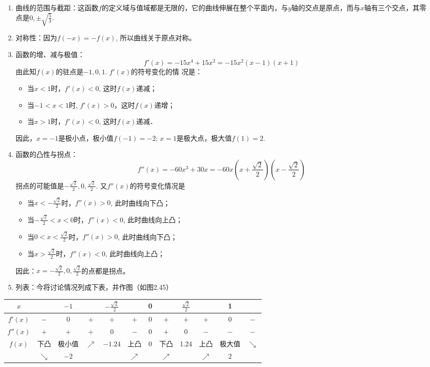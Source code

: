     \begin{solution}
    \begin{enumerate}
    \item 曲线的范围与截距：这函数$f$的定义域与值域都是无限的，它的曲线伸展在整个平面内，与$y$轴的交点是原点，而与$x$轴有三个交点，其零点是$0,\pm\sqrt{\frac{5}{3}}$.
    \item 对称性：因为$f(-x)=-f(x)$, 所以曲线关于原点对称。
    \item 函数的增、减与极值：
    \[f' (x) =-15x^4+15x^2=-15x^2 (x-1) (x+1)\]
    由此知$f(x)$的驻点是$-1, 0, 1$. $f'(x)$的符号变化的情
    况是：
    \begin{itemize}
        \item 当$x<1$时，$f'(x)<0$, 这时$f(x)$递减；
        \item 当$-1<x<1$时, $f'(x)>0$，这时$f(x)$递增；
        \item 当$x>1$时，$f'(x)<0$, 这时$f(x)$递减．
    \end{itemize}
    因此，$x=-1$是极小点，极小值$f(-1)=-2$; $x=1$是极大点，极大值$f(1)=2$.
    \item 函数的凸性与拐点：
    \[f''(x)=-60x^3+30x=-60x\left(x+\frac{\sqrt{2}}{2}\right)\left(x-\frac{\sqrt{2}}{2}\right)\]
    拐点的可能值是$-\frac{\sqrt{2}}{2},0,\frac{\sqrt{2}}{2}$. 又$f''(x)$的符号变化情况是
    \begin{itemize}
        \item 当$x<-\frac{\sqrt{2}}{2}$时，$f''(x)>0$, 此时曲线向下凸；
        \item 当$-\frac{\sqrt{2}}{2}<x<0$时，$f''(x)<0$, 此时曲线向上凸；
        \item 当$0<x<\frac{\sqrt{2}}{2}$时，$f''(x)>0$, 此时曲线向下凸；
        \item 当$x>\frac{\sqrt{2}}{2}$时，$f''(x)<0$, 此时曲线向上凸；
    \end{itemize}
    因此：$x=-\frac{\sqrt{2}}{2},0,\frac{\sqrt{2}}{2}$的点都是拐点。
    
    \item 列表：今将讨论情况列成下表，并作图（如图2.45）
    \end{enumerate}    
    \begin{center}\small
        \begin{tabular}{cccccccccccc}
        \hline
        $x$ & &$-1$&&$-\frac{\sqrt{2}}{2}$&&0&&$\frac{\sqrt{2}}{2}$&&1\\
        \hline
        $f'(x)$& $-$ & 0&$+$&$+$&$+$&0&$+$&$+$&$+$&0&$-$\\
        $f''(x)$&$+$&$+$&$+$&0&$-$&0&$+$&0&$-$&$-$&$-$\\
        $f(x)$&下凸&极小值& $\nearrow$  & $-1.24$&上凸 & 0& 下凸 &1.24& 上凸 & 极大值 & $\searrow$  \\
        & $\searrow $ &$-2$&&&$\nearrow $&&$\nearrow $&&$\nearrow $&2\\
        \hline
        \end{tabular}
        \end{center}
        

\end{solution}
